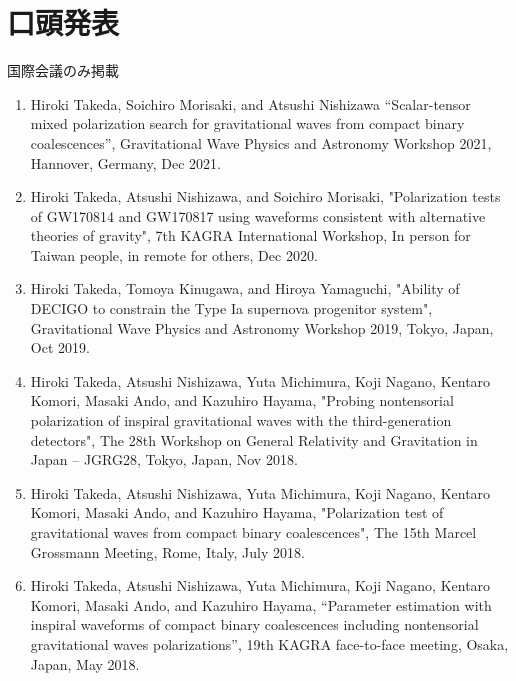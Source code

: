 \documentclass[uplatex, 12pt,a4paper]{jsarticle}
\begin{document}
\section*{口頭発表}
国際会議のみ掲載
\begin{enumerate}

\item Hiroki Takeda, Soichiro Morisaki, and Atsushi Nishizawa “Scalar-tensor mixed polarization search for gravitational waves from compact binary coalescences”, Gravitational Wave Physics and Astronomy Workshop 2021, Hannover, Germany, Dec 2021.

\item Hiroki Takeda, Atsushi Nishizawa, and Soichiro Morisaki, "Polarization tests of GW170814 and GW170817 using waveforms consistent with alternative theories of gravity", 7th KAGRA International Workshop, In person for Taiwan people, in remote for others, Dec 2020.

\item Hiroki Takeda, Tomoya Kinugawa, and Hiroya Yamaguchi, "Ability of DECIGO to constrain the Type Ia supernova progenitor system", Gravitational Wave Physics and Astronomy Workshop 2019, Tokyo, Japan, Oct 2019.

\item Hiroki Takeda, Atsushi Nishizawa, Yuta Michimura, Koji Nagano, Kentaro Komori, Masaki Ando, and Kazuhiro Hayama, "Probing nontensorial polarization of inspiral gravitational waves with the third-generation detectors", The 28th Workshop on General Relativity and Gravitation in Japan – JGRG28, Tokyo, Japan, Nov 2018.

\item Hiroki Takeda, Atsushi Nishizawa, Yuta Michimura, Koji Nagano, Kentaro Komori, Masaki Ando, and Kazuhiro Hayama, "Polarization test of gravitational waves from compact binary coalescences", The 15th Marcel Grossmann Meeting, Rome, Italy, July 2018.

\item Hiroki Takeda, Atsushi Nishizawa, Yuta Michimura, Koji Nagano, Kentaro Komori, Masaki Ando, and Kazuhiro Hayama, “Parameter estimation with inspiral waveforms of compact binary coalescences including nontensorial gravitational waves polarizations”, 19th KAGRA face-to-face meeting, Osaka, Japan, May 2018.

\end{enumerate}
\end{document}
